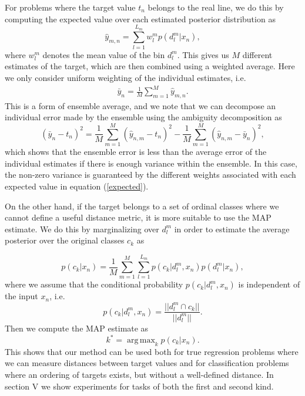 \documentclass[10pt, conference, a4paper]{IEEEtran}
\DeclareMathOperator*{\argmax}{arg\,max}
\begin{document}
For problems where the target value $t_n$ belongs to the real line, we do this by computing the expected value over each estimated posterior distribution as
\begin{equation}
\hat{y}_{m,n} = \sum_{l=1}^{L_m} w^m_l p(d^m_l | x_n),
\label{expected}
\end{equation}
where $w^m_l$ denotes the mean value of the bin $d^m_l$. This gives us $M$ different estimates of the target, which are then combined using a weighted average. Here we only consider uniform weighting of the individual estimates, i.e.
\begin{align}
\bar{y}_n = \frac{1}{M} \sum_{m=1}^M \hat{y}_{m,n}.
\label{ybar}
\end{align}
This is a form of ensemble average, and we note that we can decompose an individual error made by the ensemble using the ambiguity decomposition \cite{brown2003use} as
\begin{equation}
(\bar{y}_n - t_n)^2 = \frac{1}{M} \sum_{m=1}^M (\hat{y}_{n, m} - t_n)^2 - \frac{1}{M} \sum_{m=1}^M (\hat{y}_{n, m} - \bar{y}_n)^2 ,
\label{amb}
\end{equation}
which shows that the ensemble error is less than the average error of the individual estimates if there is enough variance within the ensemble. In this case, the non-zero variance is guaranteed by the different weights associated with each expected value in equation (\ref{expected}).

On the other hand, if the target belongs to a set of ordinal classes where we cannot define a useful distance metric, it is more suitable to use the MAP estimate. We do this by marginalizing over $d^m_l$ in order to estimate the average posterior over the original classes $c_k$ as

\begin{equation}
p(c_k | x_n) = \frac{1}{M} \sum_{m=1}^M \sum_{l=1}^{L_m} p(c_k | d^m_l, x_n) p(d^m_l | x_n),
\end{equation}
where we assume that the conditional probability $p(c_k | d^m_l, x_n)$ is independent of the input $x_n$, i.e.
\begin{equation}
p(c_k | d^m_l, x_n) = \frac{||d^m_l \cap c_k||}{||d^m_l||} .
\end{equation}
Then we compute the MAP estimate as 
\begin{equation}
k^* = \argmax_k p(c_k | x_n) .
\label{map}
\end{equation}
This shows that our method can be used both for true regression problems where we can measure distances between target values and for classification problems where an ordering of targets exists, but without a well-defined distance. In section V we show experiments for tasks of both the first and second kind.
\end{document}
